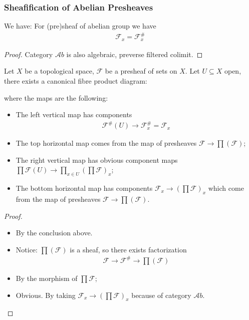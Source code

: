 \documentclass[Total.tex]{subfiles}
\begin{document}
				\subsubsection{Sheafification of Abelian Presheaves}
					\begin{lemma}
						We have: For (pre)sheaf of abelian group we have
						\begin{gather*}
							\mathcal{F}_x=\mathcal{F}_x^\#
						\end{gather*}
					\end{lemma}
					\begin{proof}
						Category $\mathcal Ab$ is also algebraic, preverse filtered colimit.
					\end{proof}
					\begin{lemma}
						Let $X$ be a topological space, $\mathcal{F}$ be a presheaf of sets on $X$. Let $U\subseteq X$ open, there exists a canonical fibre product diagram:
						\begin{center}
						\end{center}
						where the maps are the following:
						\begin{itemize}
							\item The left vertical map has components
							\begin{gather*}
								\mathcal{F}^\#(U)\rightarrow \mathcal{F}^\#_x=\mathcal{F}_x
							\end{gather*}
							\item The top horizontal map comes from the map of presheaves $\mathcal{F}\rightarrow \prod  (\mathcal{F})$;
							\item The right vertical map has obvious component maps $\prod \mathcal{F}(U)\rightarrow \prod_{x\in U} (\prod \mathcal{F})_x$;
							\item The bottom horizontal map has components $\mathcal{F}_x\rightarrow (\prod \mathcal{F})_x$ which come from the map of presheaves $\mathcal{F}\rightarrow \prod (\mathcal{F})$.
						\end{itemize}
					\end{lemma}
					\begin{proof}
						\begin{itemize}
							\item By the conclusion above.
							\item Notice: $\prod(\mathcal{F})$ is a sheaf, so there exists factorization
							\begin{gather*}
								\mathcal{F}\rightarrow \mathcal{F}^\#\rightarrow \prod (\mathcal{F})
							\end{gather*}
							\item By the morphism of $\prod \mathcal{F}$;
							\item Obvious. By taking $\mathcal{F}_x\rightarrow (\prod \mathcal{F})_x$ because of category $\mathcal Ab$.
						\end{itemize}
					\end{proof}
					
\end{document}
